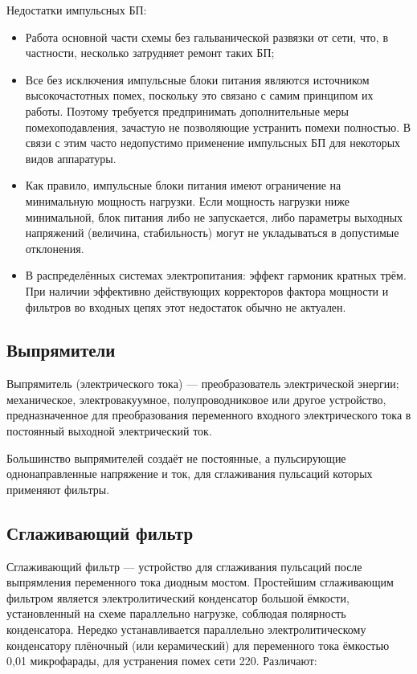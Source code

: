 Недостатки импульсных БП:

\begin{itemize}
\item Работа основной части схемы без гальванической развязки от сети, что, в частности, несколько затрудняет ремонт таких БП;
\item Все без исключения импульсные блоки питания являются источником высокочастотных помех, поскольку это связано с самим принципом их работы. Поэтому требуется предпринимать дополнительные меры помехоподавления, зачастую не позволяющие устранить помехи полностью. В связи с этим часто недопустимо применение импульсных БП для некоторых видов аппаратуры.
\item Как правило, импульсные блоки питания имеют ограничение на минимальную мощность нагрузки. Если мощность нагрузки ниже минимальной, блок питания либо не запускается, либо параметры выходных напряжений (величина, стабильность) могут не укладываться в допустимые отклонения.
\item В распределённых системах электропитания: эффект гармоник кратных трём. При наличии эффективно действующих корректоров фактора мощности и фильтров во входных цепях этот недостаток обычно не актуален.
\end{itemize}

\subsection*{Выпрямители}

Выпрямитель (электрического тока) --- преобразователь электрической энергии; механическое, электровакуумное, полупроводниковое или другое устройство, предназначенное для преобразования переменного входного электрического тока в постоянный выходной электрический ток.

Большинство выпрямителей создаёт не постоянные, а пульсирующие однонаправленные напряжение и ток, для сглаживания пульсаций которых применяют фильтры.

\subsection*{Сглаживающий фильтр}

Сглаживающий фильтр --- устройство для сглаживания пульсаций после выпрямления переменного тока диодным мостом. Простейшим сглаживающим фильтром является электролитический конденсатор большой ёмкости, установленный на схеме параллельно нагрузке, соблюдая полярность конденсатора. Нередко устанавливается параллельно электролитическому конденсатору плёночный (или керамический) для переменного тока ёмкостью 0,01 микрофарады, для устранения помех сети 220. Различают:

